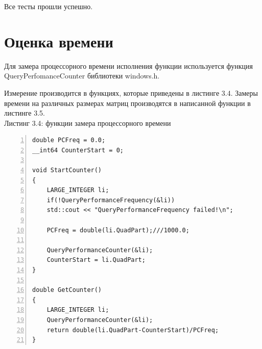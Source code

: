 \documentclass[12pt,a4paper]{report}
\begin{document}
Все тесты прошли успешно.

\newpage
\section{Оценка времени}

Для замера процессорного времени исполнения функции используется функция 
QueryPerfomanceCounter библиотеки windows.h. 

Измерение производится в функциях, которые приведены в листинге 3.4.
Замеры времени на различных размерах матриц производятся в написанной
функции в листинге 3.5. \\

\textrm{Листинг 3.4: функции замера процессорного времени}
\begin{lstlisting}[frame=single, numbers=left]
double PCFreq = 0.0;
__int64 CounterStart = 0;
    
void StartCounter()
{
    LARGE_INTEGER li;
    if(!QueryPerformanceFrequency(&li))
    std::cout << "QueryPerformanceFrequency failed!\n";
    
    PCFreq = double(li.QuadPart);///1000.0;
    
    QueryPerformanceCounter(&li);
    CounterStart = li.QuadPart;
}
    
double GetCounter()
{
    LARGE_INTEGER li;
    QueryPerformanceCounter(&li);
    return double(li.QuadPart-CounterStart)/PCFreq;
}
\end{lstlisting}
\end{document}
